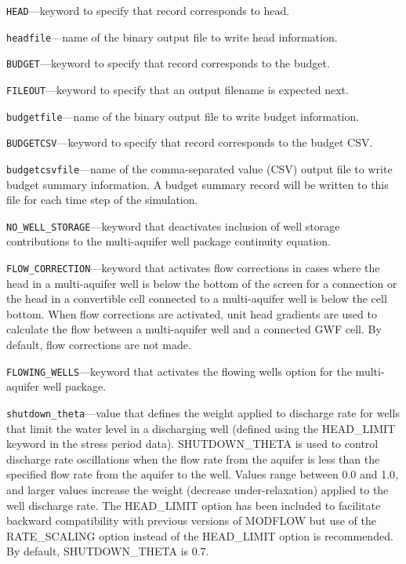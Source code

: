 \begin{description}
\item \texttt{HEAD}---keyword to specify that record corresponds to head.

\item \texttt{headfile}---name of the binary output file to write head information.

\item \texttt{BUDGET}---keyword to specify that record corresponds to the budget.

\item \texttt{FILEOUT}---keyword to specify that an output filename is expected next.

\item \texttt{budgetfile}---name of the binary output file to write budget information.

\item \texttt{BUDGETCSV}---keyword to specify that record corresponds to the budget CSV.

\item \texttt{budgetcsvfile}---name of the comma-separated value (CSV) output file to write budget summary information.  A budget summary record will be written to this file for each time step of the simulation.

\item \texttt{NO\_WELL\_STORAGE}---keyword that deactivates inclusion of well storage contributions to the multi-aquifer well package continuity equation.

\item \texttt{FLOW\_CORRECTION}---keyword that activates flow corrections in cases where the head in a multi-aquifer well is below the bottom of the screen for a connection or the head in a convertible cell connected to a multi-aquifer well is below the cell bottom. When flow corrections are activated, unit head gradients are used to calculate the flow between a multi-aquifer well and a connected GWF cell. By default, flow corrections are not made.

\item \texttt{FLOWING\_WELLS}---keyword that activates the flowing wells option for the multi-aquifer well package.

\item \texttt{shutdown\_theta}---value that defines the weight applied to discharge rate for wells that limit the water level in a discharging well (defined using the HEAD\_LIMIT keyword in the stress period data). SHUTDOWN\_THETA is used to control discharge rate oscillations when the flow rate from the aquifer is less than the specified flow rate from the aquifer to the well. Values range between 0.0 and 1.0, and larger values increase the weight (decrease under-relaxation) applied to the well discharge rate. The HEAD\_LIMIT option has been included to facilitate backward compatibility with previous versions of MODFLOW but use of the RATE\_SCALING option instead of the HEAD\_LIMIT option is recommended. By default, SHUTDOWN\_THETA is 0.7.


\end{description}
